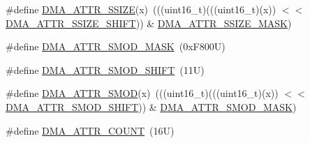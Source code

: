 \begin{DoxyCompactItemize}
\item 
\#define \mbox{\hyperlink{group___d_m_a___register___masks_gab86855f2aff624b11942ebf79dbcb1b6}{D\+M\+A\+\_\+\+A\+T\+T\+R\+\_\+\+S\+S\+I\+ZE}}(x)~(((uint16\+\_\+t)(((uint16\+\_\+t)(x)) $<$$<$ \mbox{\hyperlink{group___d_m_a___register___masks_ga815c285ac74667a99f2a7ce5e686641b}{D\+M\+A\+\_\+\+A\+T\+T\+R\+\_\+\+S\+S\+I\+Z\+E\+\_\+\+S\+H\+I\+FT}})) \& \mbox{\hyperlink{group___d_m_a___register___masks_ga30f2f09fb581b8c9619414125cf3045b}{D\+M\+A\+\_\+\+A\+T\+T\+R\+\_\+\+S\+S\+I\+Z\+E\+\_\+\+M\+A\+SK}})
\item 
\#define \mbox{\hyperlink{group___d_m_a___register___masks_ga288d7e465abd4be34477ae308a9b0982}{D\+M\+A\+\_\+\+A\+T\+T\+R\+\_\+\+S\+M\+O\+D\+\_\+\+M\+A\+SK}}~(0x\+F800\+U)
\item 
\#define \mbox{\hyperlink{group___d_m_a___register___masks_gaebf723df7b7cad164714583c0876a378}{D\+M\+A\+\_\+\+A\+T\+T\+R\+\_\+\+S\+M\+O\+D\+\_\+\+S\+H\+I\+FT}}~(11\+U)
\item 
\#define \mbox{\hyperlink{group___d_m_a___register___masks_ga820fb5655da874e3672c8608b18ecfc9}{D\+M\+A\+\_\+\+A\+T\+T\+R\+\_\+\+S\+M\+OD}}(x)~(((uint16\+\_\+t)(((uint16\+\_\+t)(x)) $<$$<$ \mbox{\hyperlink{group___d_m_a___register___masks_gaebf723df7b7cad164714583c0876a378}{D\+M\+A\+\_\+\+A\+T\+T\+R\+\_\+\+S\+M\+O\+D\+\_\+\+S\+H\+I\+FT}})) \& \mbox{\hyperlink{group___d_m_a___register___masks_ga288d7e465abd4be34477ae308a9b0982}{D\+M\+A\+\_\+\+A\+T\+T\+R\+\_\+\+S\+M\+O\+D\+\_\+\+M\+A\+SK}})
\item 
\#define \mbox{\hyperlink{group___d_m_a___register___masks_gaf45837e3176dfa475d5522e4669cca8b}{D\+M\+A\+\_\+\+A\+T\+T\+R\+\_\+\+C\+O\+U\+NT}}~(16\+U)
\end{DoxyCompactItemize}
